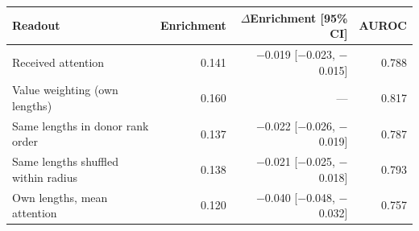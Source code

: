 \begin{tabular}{@{}lrrr@{}}
\toprule
Readout & Enrichment & $\Delta$Enrichment [95\% CI] & AUROC \\
\midrule
Received attention & 0.141 & $-$0.019 [$-$0.023, $-$0.015] & 0.788 \\
Value weighting (own lengths) & 0.160 & --- & 0.817 \\
Same lengths in donor rank order & 0.137 & $-$0.022 [$-$0.026, $-$0.019] & 0.787 \\
Same lengths shuffled within radius & 0.138 & $-$0.021 [$-$0.025, $-$0.018] & 0.793 \\
Own lengths, mean attention & 0.120 & $-$0.040 [$-$0.048, $-$0.032] & 0.757 \\
\bottomrule
\end{tabular}
